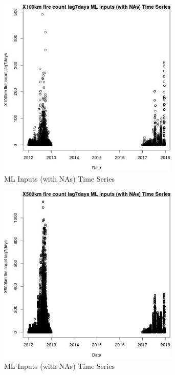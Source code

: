 \begin{figure} 
\centering  
\includegraphics[width=0.77\textwidth]{Code_Outputs/Report_ML_input_PM25_Step4_part_e_de_duplicated_aves_compiled_2019-05-14wNAs_X100km_fire_count_lag7daysvDate.jpg} 
\caption{\label{fig:Report_ML_input_PM25_Step4_part_e_de_duplicated_aves_compiled_2019-05-14wNAsX100km_fire_count_lag7daysvDate}ML Inputs (with NAs) Time Series} 
\end{figure} 
 

\clearpage 

\begin{figure} 
\centering  
\includegraphics[width=0.77\textwidth]{Code_Outputs/Report_ML_input_PM25_Step4_part_e_de_duplicated_aves_compiled_2019-05-14wNAs_X500km_fire_count_lag7daysvDate.jpg} 
\caption{\label{fig:Report_ML_input_PM25_Step4_part_e_de_duplicated_aves_compiled_2019-05-14wNAsX500km_fire_count_lag7daysvDate}ML Inputs (with NAs) Time Series} 
\end{figure} 
 

